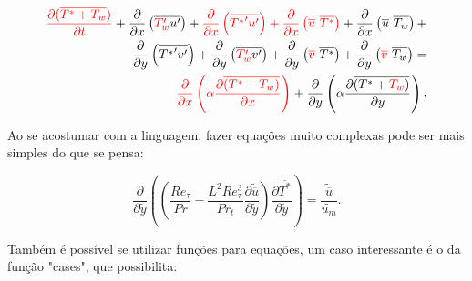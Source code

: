 \begin{center}
\begin{equation}
	\begin{split}
	\color{red}\frac{\partial ( \overline{ T^\ast + T_w } ) }{\partial t} \color{black} +
	\frac{\partial{}}{\partial{x}} \left(\overline{ \color{red}T_w^{\prime} \color{black} u^{\prime}}\right) +
	\color{red}\frac{\partial{}}{\partial{x}} \left(\overline{{T^{\ast}}^{\prime} u^{\prime}}\right)+ \color{black}
	\color{red} \frac{\partial{}}{\partial{x}}\left(\overline{u} \ \overline{T^{\ast}}\right) \color{black}+ 
	\frac{\partial{}}{\partial{x}}\left(\overline{u} \ \overline{T_w}\right)+ 
	\\
	\frac{\partial{}}{\partial{y}} \left(\overline{{T^{\ast}}^{\prime} v^{\prime}}\right)+
	\frac{\partial{}}{\partial{y}} \left(\overline{\color{red}T_w^\prime \color{black} v^\prime}\right) + \frac{\partial{}}{\partial{y}}\left(\color{red}\overline{v} \color{black} \ \overline{T^\ast}\right) +
	\frac{\partial{}}{\partial{y}}\left(\color{red}\overline{v}\color{black} \ \overline{T_w}\right) 
	= 
	\\
	\color{red}{\frac{\partial{}}{\partial{x}}} \left(\alpha {\frac{\partial{\overline{(T^\ast + T_w)}}}{\partial{x}}} \right) \color{black}+
	{\frac{\partial{}}{\partial{y}}} \left(\alpha {\frac{\partial{\overline{(T^\ast + \color{red} T_w \color{black})}}}{\partial{y}}} \right) .
	\end{split}
\end{equation}
\end{center}

Ao se acostumar com a linguagem, fazer equações muito complexas pode ser mais simples do que se pensa:

\begin{equation}
	{\frac{\partial{}}{\partial{\tilde{y}}}} \left( \left( \frac{Re_\tau}{Pr}   
	- \frac{{L}^2 Re_\tau ^3}{Pr_t}\frac{\partial \tilde{\overline{u}}}{\partial \tilde{y}} \right) \frac{\partial \tilde{\overline{T^\ast}}}{\partial \tilde{y}} \right)
	= 
	\frac{\tilde{\overline{u}}}{\tilde{u_m}}.
\end{equation}

Também é possível se utilizar funções para equações, um caso interessante é o da função "cases", que possibilita:

